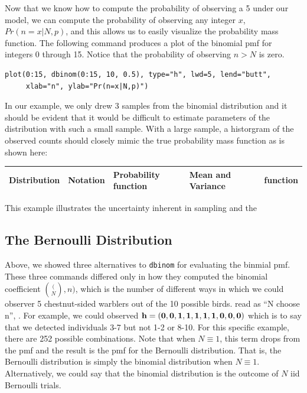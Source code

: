Now that we know how to compute the probability of observing a 5 under
our model, we can compute the probability of observing any
integer $x$, $Pr(n=x|N,p)$, and this allows us to easily visualize the
probability mass function. The following command produces a plot of
the binomial pmf for integers 0 through 15. Notice that the
probability of observing $n>N$ is zero.

\begin{verbatim}
plot(0:15, dbinom(0:15, 10, 0.5), type="h", lwd=5, lend="butt",
     xlab="n", ylab="Pr(n=x|N,p)")
\end{verbatim}

In our example, we only drew 3 samples from the binomial distribution
and it should be evident that it would be difficult to estimate
parameters of the distribution with such a small sample. With a large
sample, a historgram of the observed counts should closely mimic the
true probability mass function as is shown here:



\begin{table}
  \begin{tabular}[t]{lllll}
    \hline
    Distribution & Notation & Probability function & Mean and Variance
    & \R~function \\
    \hline
  \end{tabular}
  \label{stat.tab.pdfs}
\end{table}


This
example illustrates the uncertainty inherent in sampling and the



\subsection{The Bernoulli Distribution}


Above, we showed three alternatives to \verb+dbinom+ for evaluating the
binmial pmf. These three commands differed only in how they computed the binomial coefficient
$\binom(N,n)$, which is the number of different ways in
which we could observer 5 chestnut-sided warblers out of the 10
possible birds. read as ``N
choose n'', . For example, we could observed $\bf{h}=(0,0,1,1,1,1,1,0,0,0)$
which is to say that we detected individuals 3-7 but not 1-2 or
8-10. For this specific example, there
are 252 possible combinations. Note that when $N \equiv 1$, this term
drops from the pmf and the result is the pmf for the Bernoulli
distribution. That is, the Bernoulli distribution is simply the
binomial distribution when $N \equiv 1$. Alternatively, we could say that the binomial
distribution is the outcome of $N$ iid Bernoulli trials.

